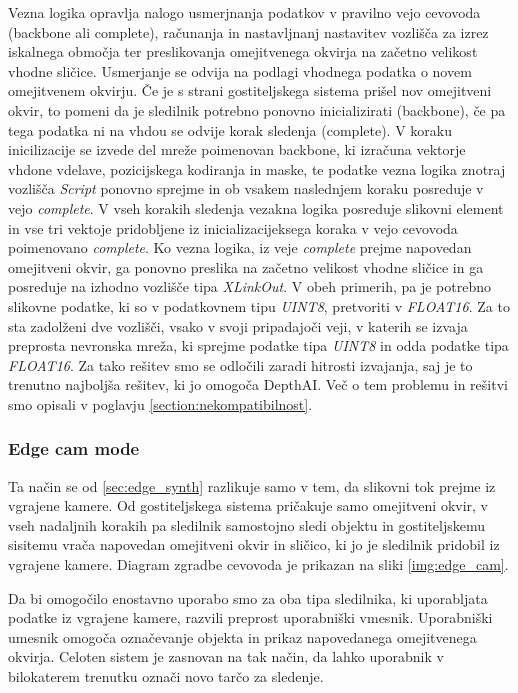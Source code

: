 \documentclass[a4paper,12pt,openright]{book}
\begin{document}
Vezna logika opravlja nalogo usmerjnanja podatkov v pravilno vejo cevovoda (backbone ali complete), računanja in nastavljnanj nastavitev vozlišča za izrez iskalnega območja ter preslikovanja omejitvenega okvirja na začetno velikost vhodne sličice. Usmerjanje se odvija na podlagi vhodnega podatka o novem omejitvenem okvirju. Če je s strani gostiteljskega sistema prišel nov omejitveni okvir, to pomeni da je sledilnik potrebno ponovno inicializirati (backbone), če pa tega podatka ni na vhdou se odvije korak sledenja (complete). V koraku inicilizacije se izvede del mreže poimenovan backbone, ki izračuna vektorje vhdone vdelave, pozicijskega kodiranja in maske, te podatke vezna logika znotraj vozlišča \emph{Script} ponovno sprejme in ob vsakem naslednjem koraku posreduje v vejo \emph{complete}. V vseh korakih sledenja vezakna logika posreduje slikovni element in vse tri vektoje pridobljene iz inicializacijeksega koraka v vejo cevovoda poimenovano \emph{complete}. Ko vezna logika, iz veje \emph{complete} prejme napovedan omejitveni okvir, ga ponovno preslika na začetno velikost vhodne sličice in ga posreduje na izhodno vozlišče tipa \emph{XLinkOut}. V obeh primerih, pa je potrebno slikovne podatke, ki so v podatkovnem tipu \emph{UINT8}, pretvoriti v \emph{FLOAT16}. Za to sta zadolženi dve vozlišči, vsako v svoji pripadajoči veji, v katerih se izvaja preprosta nevronska mreža, ki sprejme podatke tipa \emph{UINT8} in odda podatke tipa \emph{FLOAT16}. Za tako rešitev smo se odločili zaradi hitrosti izvajanja, saj je to trenutno najboljša rešitev, ki jo omogoča DepthAI. Več o tem problemu in rešitvi smo opisali v poglavju \ref{section:nekompatibilnost}.



\subsubsection{Edge cam mode}
\label{sec:edge_cam}
Ta način se od \ref{sec:edge_synth} razlikuje samo v tem, da slikovni tok prejme iz vgrajene kamere. Od gostiteljskega sistema pričakuje samo omejitveni okvir, v vseh nadaljnih korakih pa sledilnik samostojno sledi objektu in gostiteljskemu sisitemu vrača napovedan omejitveni okvir in sličico, ki jo je sledilnik pridobil iz vgrajene kamere. Diagram zgradbe cevovoda je prikazan na sliki \ref{img:edge_cam}.

Da bi omogočilo enostavno uporabo smo za oba tipa sledilnika, ki uporabljata podatke iz vgrajene kamere, razvili preprost uporabniški vmesnik. Uporabniški umesnik omogoča označevanje objekta in prikaz napovedanega omejitvenega okvirja. Celoten sistem je zasnovan na tak način, da lahko uporabnik v bilokaterem trenutku označi novo tarčo za sledenje.
\end{document}
